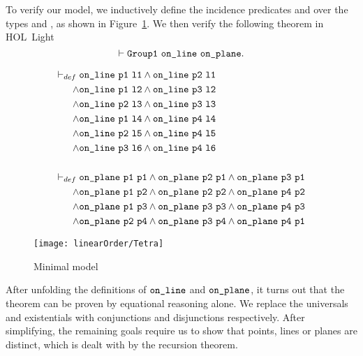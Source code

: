 To verify our model, we inductively define the incidence predicates  and  over the types  and , as shown in Figure~\ref{fig:SmallestModel}. We then verify the following theorem in HOL~Light 
\begin{displaymath}
\vdash\code{Group1}\ \code{on\_line}\ \code{on\_plane}.
\end{displaymath}

\begin{figure}
\begin{minipage}[c]{10cm}
\begin{align*}
\vdash_{def}\;&\texttt{on\_line}\ \texttt{p1}\ \texttt{l1}\wedge \texttt{on\_line}\ \texttt{p2}\ \texttt{l1}\\
\wedge & \texttt{on\_line}\ \texttt{p1}\ \texttt{l2}\wedge \texttt{on\_line}\ \texttt{p3}\ \texttt{l2}\\
\wedge & \texttt{on\_line}\ \texttt{p2}\ \texttt{l3}\wedge \texttt{on\_line}\ \texttt{p3}\ \texttt{l3}\\
\wedge & \texttt{on\_line}\ \texttt{p1}\ \texttt{l4}\wedge \texttt{on\_line}\ \texttt{p4}\ \texttt{l4}\\
\wedge & \texttt{on\_line}\ \texttt{p2}\ \texttt{l5}\wedge \texttt{on\_line}\ \texttt{p4}\ \texttt{l5}\\
\wedge & \texttt{on\_line}\ \texttt{p3}\ \texttt{l6}\wedge \texttt{on\_line}\ \texttt{p4}\ \texttt{l6}\\
\\
\vdash_{def}\;& \texttt{on\_plane}\ \texttt{p1}\ \texttt{p1}\wedge \texttt{on\_plane}\ \texttt{p2}\ \texttt{p1}\wedge \texttt{on\_plane}\ \texttt{p3}\ \texttt{p1}\\
\wedge & \texttt{on\_plane}\ \texttt{p1}\ \texttt{p2}\wedge \texttt{on\_plane}\ \texttt{p2}\ \texttt{p2}\wedge \texttt{on\_plane}\ \texttt{p4}\ \texttt{p2}\\
\wedge & \texttt{on\_plane}\ \texttt{p1}\ \texttt{p3}\wedge \texttt{on\_plane}\ \texttt{p3}\ \texttt{p3}\wedge \texttt{on\_plane}\ \texttt{p4}\ \texttt{p3}\\
\wedge & \texttt{on\_plane}\ \texttt{p2}\ \texttt{p4}\wedge \texttt{on\_plane}\ \texttt{p3}\ \texttt{p4}\wedge \texttt{on\_plane}\ \texttt{p4}\ \texttt{p1}
\end{align*}\end{minipage}\centering\hspace{-2cm}\texttt{[image: linearOrder/Tetra]}
\caption{Minimal model}
\label{fig:SmallestModel}
\end{figure}

After unfolding the definitions of $\texttt{on\_line}$ and $\texttt{on\_plane}$, it turns out that the theorem can be proven by equational reasoning alone. We replace the universals and existentials with conjunctions and disjunctions respectively. After simplifying, the remaining goals require us to show that points, lines or planes are distinct, which is dealt with by the recursion theorem.


